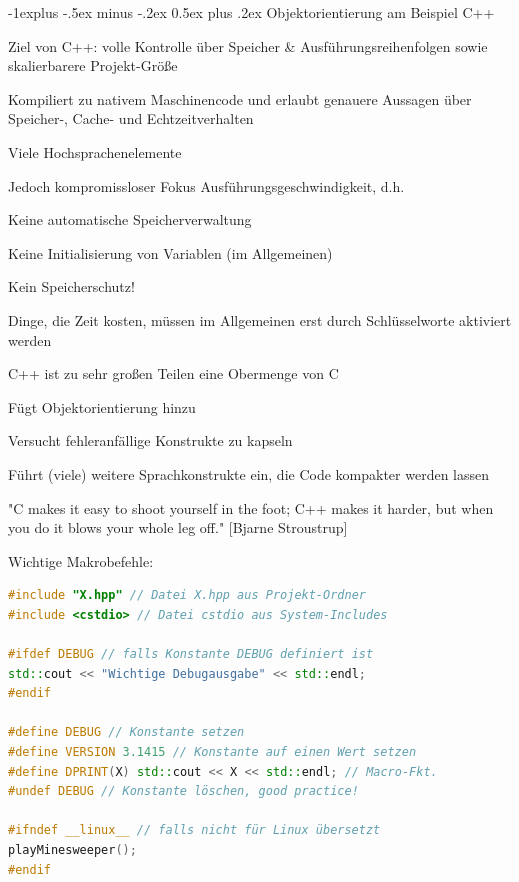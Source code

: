\documentclass[10pt]{article}
\makeatletter
\renewcommand{\subsection}{\@startsection{subsection}{2}{0mm}%
                                {-1explus -.5ex minus -.2ex}%
                                {0.5ex plus .2ex}%
                                {\normalfont\normalsize\bfseries}}
\makeatother
\begin{document}
\subsection{Objektorientierung am Beispiel C++}
\begin{itemize*}
  \item Ziel von C++: volle Kontrolle über Speicher \& Ausführungsreihenfolgen sowie skalierbarere Projekt-Größe
  \item Kompiliert zu nativem Maschinencode und erlaubt genauere Aussagen über Speicher-, Cache- und Echtzeitverhalten
  \item Viele Hochsprachenelemente
  \item Jedoch kompromissloser Fokus Ausführungsgeschwindigkeit, d.h.
  \begin{itemize*}
    \item Keine automatische Speicherverwaltung
    \item Keine Initialisierung von Variablen (im Allgemeinen)
    \item Kein Speicherschutz!
    \item Dinge, die Zeit kosten, müssen im Allgemeinen erst durch Schlüsselworte aktiviert werden
  \end{itemize*}
  \item C++ ist zu sehr großen Teilen eine Obermenge von C
  \begin{itemize*}
    \item Fügt Objektorientierung hinzu
    \item Versucht fehleranfällige Konstrukte zu kapseln
    \item Führt (viele) weitere Sprachkonstrukte ein, die Code kompakter werden lassen
  \end{itemize*}
\end{itemize*}

"C makes it easy to shoot yourself in the foot; C++ makes it harder, but when you do it blows your whole leg off." [Bjarne Stroustrup]

Wichtige Makrobefehle:
\begin{lstlisting}[language=C++]
#include "X.hpp" // Datei X.hpp aus Projekt-Ordner
#include <cstdio> // Datei cstdio aus System-Includes

#ifdef DEBUG // falls Konstante DEBUG definiert ist
std::cout << "Wichtige Debugausgabe" << std::endl;
#endif

#define DEBUG // Konstante setzen
#define VERSION 3.1415 // Konstante auf einen Wert setzen
#define DPRINT(X) std::cout << X << std::endl; // Macro-Fkt.
#undef DEBUG // Konstante löschen, good practice!

#ifndef __linux__ // falls nicht für Linux übersetzt
playMinesweeper();
#endif
\end{lstlisting}
\end{document}
